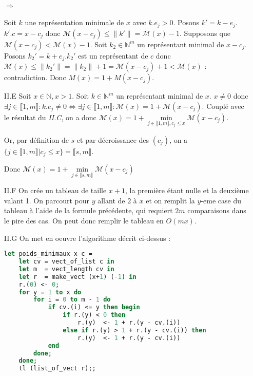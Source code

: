 \documentclass{article}
\newcommand{\N}{\mathbb{N}}
\newcommand{\M}{\mathscr{M}}
\newcommand{\norm}[1]{\|#1\|}
\newcommand{\scal}{.}
\newcommand{\seg}[2]{\llbracket #1, #2 \rrbracket}
\begin{document}
\begin{enumerate}
        \paragraph{$\Rightarrow$} Soit $k$ une représentation minimale de $x$ avec $k\scal e_j > 0$. Posons $k' = k-e_j$. $k'\scal c = x-c_j$ donc $\M(x-c_j) \leq \norm{k'} = \M(x) - 1$. Supposons que $\M(x-c_j) < \M(x) - 1$. Soit $k_2\in\N^m$ un représentant minimal de $x-c_j$. Posons $k_2' = k + e_j$.$k_2'$ est un représentant de $c$ donc $\M(x) \leq \norm{k_2'} = \norm{k_2} + 1 = \M(x-c_j) + 1 < \M(x)$ : contradiction. Donc $M(x) = 1 + M(x-c_j)$.

    \item[II.E] Soit $x\in\N, x > 1$. Soit $k\in\N^m$ un représentant minimal de $x$. $x\neq 0$ donc $\exists j\in\seg{1}{m} : k\scal e_j \neq 0 \Leftrightarrow \exists j\in\seg{1}{m} : \M(x) = 1 + \M(x-c_j)$. Couplé avec le résultat du \emph{II.C}, on a donc $\M(x) = 1 + \underset{j\in\seg{1}{m}, c_j\leq x}{\min} \M(x-c_j)$.

        Or, par définition de $s$ et par décroissance des $(c_j)$, on a $\{j\in\seg{1}{m} | c_j \leq x\} = \seg{s}{m}$.

        Donc $\M(x) = 1 + \underset{j\in\seg{s}{m}}{\min} \M(x-c_j)$

    \item[II.F] On crée un tableau de taille $x+1$, la première étant nulle et la deuxième valant 1. On parcourt pour $y$ allant de $2$ à $x$ et on remplit la $y$-eme case du tableau à l'aide de la formule précédente, qui requiert $2m$ comparaisons dans le pire des cas. On peut donc remplir le tableau en $O(mx)$.

    \item[II.G] On met en oeuvre l'algorithme décrit ci-dessus :
        \begin{lstlisting}[language=Caml]
let poids_minimaux x c =
    let cv = vect_of_list c in
    let m  = vect_length cv in
    let r  = make_vect (x+1) (-1) in
    r.(0) <- 0;
    for y = 1 to x do
        for i = 0 to m - 1 do
            if cv.(i) <= y then begin
                if r.(y) < 0 then
                    r.(y)  <- 1 + r.(y - cv.(i))
                else if r.(y) > 1 + r.(y - cv.(i)) then
                    r.(y)  <- 1 + r.(y - cv.(i))
            end
        done;
    done;
    tl (list_of_vect r);;
        \end{lstlisting}
\end{enumerate}
\end{document}
